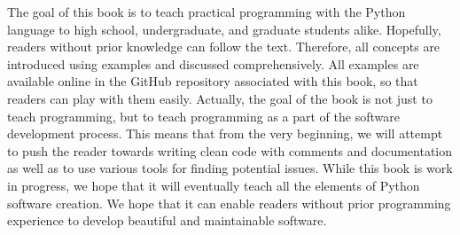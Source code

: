 %
The goal of this book is to teach practical programming with the Python language to high school, undergraduate, and graduate students alike.
Hopefully, readers without prior knowledge can follow the text.
Therefore, all concepts are introduced using examples and discussed comprehensively.
All examples are available online in the GitHub repository associated with this book, so that readers can play with them easily.
Actually, the goal of the book is not just to teach programming, but to teach programming as a part of the software development process.
This means that from the very beginning, we will attempt to push the reader towards writing clean code with comments and documentation as well as to use various tools for finding potential issues.
While this book is work in progress, we hope that it will eventually teach all the elements of Python software creation.
We hope that it can enable readers without prior programming experience to develop beautiful and maintainable software.
%
